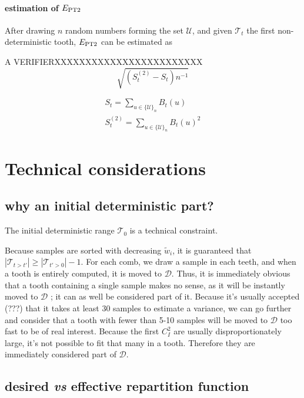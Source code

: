 \documentclass[./thesis.tex]{subfiles}
\begin{document}
\paragraph{estimation of $E_\text{PT2}$}

After drawing $n$ random numbers forming the set $\mathcal{U}$, and given $\mathcal{T}_t$ the first non-deterministic tooth, $E_\text{PT2}$ can be estimated as 

\alert{A VERIFIERXXXXXXXXXXXXXXXXXXXXXXXX}
\begin{equation}
\sqrt{(S_{t}^{(2)} - S_{t}) n^{-1} }
\end{equation}		

\begin{align}
 S_{t} = \sum_{u \in \{\mathcal{U}\}_n} B_{t}(u) \\
 S^{(2)}_{t} = \sum_{u \in \{\mathcal{U}\}_n} B_{t}(u)^2
\end{align}




\section{Technical considerations}


\subsection*{why an initial deterministic part?}

The initial deterministic range $\mathcal{T}_0$ is a technical constraint.

Because samples are sorted with decreasing $\tilde w_i$, it is guaranteed that $|\mathcal{T}_{t>t'}| \geq |\mathcal{T}_{t'>0}|-1$.
For each comb, we draw a sample in each teeth, and when a tooth is entirely computed, it is moved to $\mathcal{D}$. Thus, it is immediately obvious that a tooth containing a single sample makes no sense, as it will be instantly moved to $\mathcal{D}$ ; it can as well be considered part of it. Because it's usually accepted (???) that it takes at least 30 samples to estimate a variance, we can go further and consider that a tooth with fewer than 5-10 samples will be moved to $\mathcal{D}$ too fast to be of real interest. Because the first $C_I^2$ are usually disproportionately large, it's not possible to fit that many in a tooth. Therefore they are immediately considered part of $\mathcal{D}$.

\subsection*{desired \textit{vs} effective repartition function}
\end{document}
